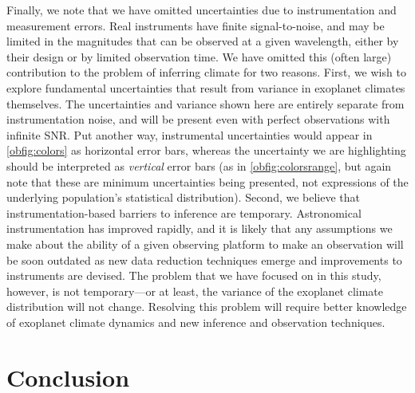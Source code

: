 \documentclass[fleqn,usenatbib]{mnras}
\begin{document}
Finally, we note that we have omitted uncertainties due to instrumentation and measurement errors. Real instruments have finite signal-to-noise, and may be limited in the magnitudes that can be observed at a given wavelength, either by their design or by limited observation time. We have omitted this (often large) contribution to the problem of inferring climate for two reasons. First, we wish to explore fundamental uncertainties that result from variance in exoplanet climates themselves. The uncertainties and variance shown here are entirely separate from instrumentation noise, and will be present even with perfect observations with infinite SNR. Put another way, instrumental uncertainties would appear in \autoref{obfig:colors} as horizontal error bars, whereas the uncertainty we are highlighting should be interpreted as \textit{vertical} error bars (as in \autoref{obfig:colorsrange}, but again note that these are minimum uncertainties being presented, not expressions of the underlying population's statistical distribution). Second, we believe that instrumentation-based barriers to inference are temporary. Astronomical instrumentation has improved rapidly, and it is likely that any assumptions we make about the ability of a given observing platform to make an observation will be soon outdated as new data reduction techniques emerge and improvements to instruments are devised. The problem that we have focused on in this study, however, is not temporary---or at least, the variance of the exoplanet climate distribution will not change. Resolving this problem will require better knowledge of exoplanet climate dynamics and new inference and observation techniques.

\section{Conclusion}
\end{document}
